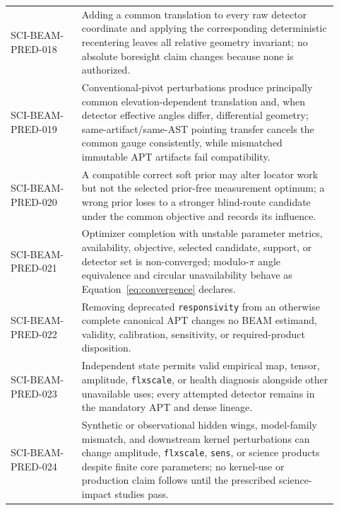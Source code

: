 \begin{longtable}{>{\raggedright\arraybackslash\ttfamily\scriptsize}p{0.20\linewidth}L{0.72\linewidth}}
SCI-BEAM-PRED-018 & Adding a common translation to every raw detector coordinate and applying the corresponding deterministic recentering leaves all relative geometry invariant; no absolute boresight claim changes because none is authorized. \\
SCI-BEAM-PRED-019 & Conventional-pivot perturbations produce principally common elevation-dependent translation and, when detector effective angles differ, differential geometry; same-artifact/same-AST pointing transfer cancels the common gauge consistently, while mismatched immutable APT artifacts fail compatibility. \\
SCI-BEAM-PRED-020 & A compatible correct soft prior may alter locator work but not the selected prior-free measurement optimum; a wrong prior loses to a stronger blind-route candidate under the common objective and records its influence. \\
SCI-BEAM-PRED-021 & Optimizer completion with unstable parameter metrics, availability, objective, selected candidate, support, or detector set is non-converged; modulo-$\pi$ angle equivalence and circular unavailability behave as Equation~\ref{eq:convergence} declares. \\
SCI-BEAM-PRED-022 & Removing deprecated \texttt{responsivity} from an otherwise complete canonical APT changes no BEAM estimand, validity, calibration, sensitivity, or required-product disposition. \\
SCI-BEAM-PRED-023 & Independent state permits valid empirical map, tensor, amplitude, \texttt{flxscale}, or health diagnosis alongside other unavailable uses; every attempted detector remains in the mandatory APT and dense lineage. \\
SCI-BEAM-PRED-024 & Synthetic or observational hidden wings, model-family mismatch, and downstream kernel perturbations can change amplitude, \texttt{flxscale}, \texttt{sens}, or science products despite finite core parameters; no kernel-use or production claim follows until the prescribed science-impact studies pass. \\
\bottomrule
\end{longtable}
